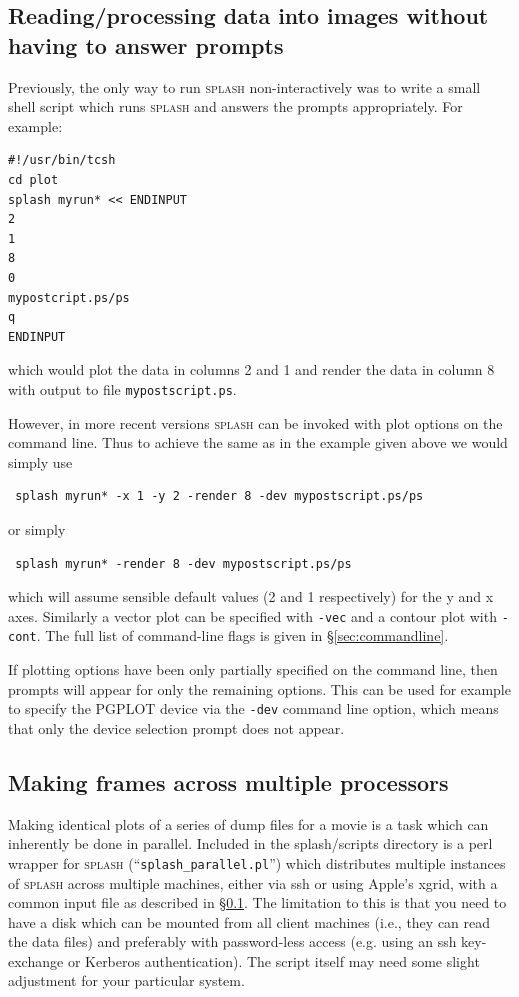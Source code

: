 \documentclass[a4paper,10pt]{article}
\newcommand{\splash}{\textsc{splash }}
\begin{document}
\subsection{Reading/processing data into images without having to answer prompts}
\label{sec:batchmode}
 Previously, the only way to run \splash
non-interactively was to write a small shell script which runs \splash
and answers the prompts appropriately. For example:
\begin{verbatim}
#!/usr/bin/tcsh
cd plot
splash myrun* << ENDINPUT
2
1
8
0
mypostcript.ps/ps
q
ENDINPUT
\end{verbatim}
which would plot the data in columns 2 and 1 and render the data in column 8 with
output to file \verb+mypostscript.ps+.

 However, in more recent versions \splash can be invoked with plot options on the command line.  Thus to achieve the same as in the example given above we would simply use
 \begin{verbatim}
 splash myrun* -x 1 -y 2 -render 8 -dev mypostscript.ps/ps
 \end{verbatim}
 or simply
 \begin{verbatim}
 splash myrun* -render 8 -dev mypostscript.ps/ps
 \end{verbatim}
which will assume sensible default values (2 and 1 respectively) for the y and x axes. Similarly a vector plot can be specified with \verb+-vec+ and a contour plot with \verb+-cont+. The full list of command-line flags is given in \S\ref{sec:commandline}.

 If plotting options have been only partially specified on the command line, then prompts will appear for only the remaining options. This can be used for example to specify the PGPLOT device via the \verb+-dev+ command line option, which means that only the device selection prompt does not appear.


\subsection{Making frames across multiple processors}
 Making identical plots of a series of dump files for a movie is a task which can inherently be done in parallel. Included in the splash/scripts directory is a perl wrapper for \splash (``\verb+splash_parallel.pl+'') which distributes multiple instances of \splash across multiple machines, either via ssh or using Apple's xgrid, with a common input file as described in \S\ref{sec:batchmode}. The limitation to this is that you need to have a disk which can be mounted from all client machines (i.e., they can read the data files) and preferably with password-less access (e.g. using an ssh key-exchange or Kerberos authentication). The script itself may need some slight adjustment for your particular system.
 
\end{document}
